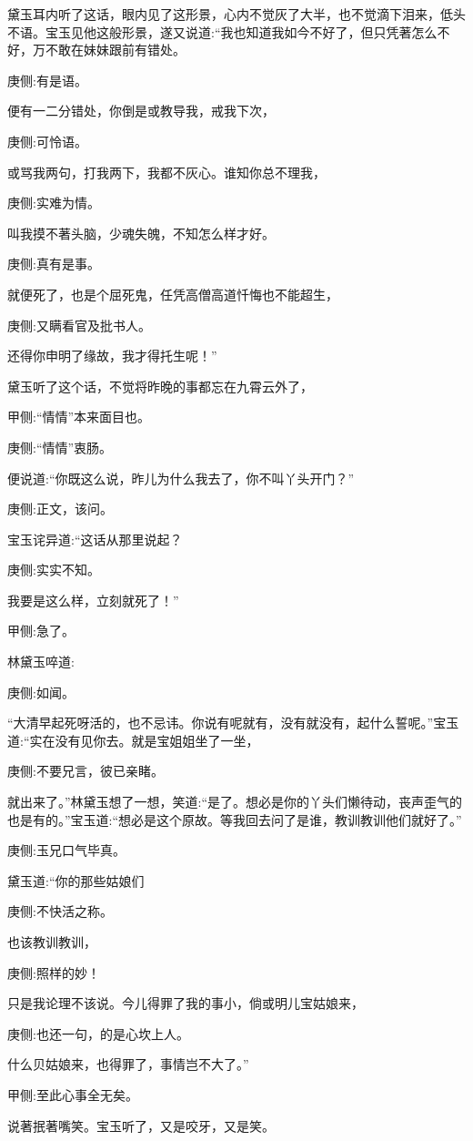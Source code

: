 \begin{parag}
    黛玉耳内听了这话，眼内见了这形景，心内不觉灰了大半，也不觉滴下泪来，低头不语。宝玉见他这般形景，遂又说道:“我也知道我如今不好了，但只凭著怎么不好，万不敢在妹妹跟前有错处。\begin{note}庚侧:有是语。\end{note}便有一二分错处，你倒是或教导我，戒我下次，\begin{note}庚侧:可怜语。\end{note}或骂我两句，打我两下，我都不灰心。谁知你总不理我，\begin{note}庚侧:实难为情。\end{note}叫我摸不著头脑，少魂失魄，不知怎么样才好。\begin{note}庚侧:真有是事。\end{note}就便死了，也是个屈死鬼，任凭高僧高道忏悔也不能超生，\begin{note}庚侧:又瞒看官及批书人。\end{note}还得你申明了缘故，我才得托生呢！”
\end{parag}


\begin{parag}
    黛玉听了这个话，不觉将昨晚的事都忘在九霄云外了，\begin{note}甲侧:“情情”本来面目也。\end{note}\begin{note}庚侧:“情情”衷肠。\end{note}便说道:“你既这么说，昨儿为什么我去了，你不叫丫头开门？”\begin{note}庚侧:正文，该问。\end{note}宝玉诧异道:“这话从那里说起？\begin{note}庚侧:实实不知。\end{note}我要是这么样，立刻就死了！”\begin{note}甲侧:急了。\end{note}林黛玉啐道:\begin{note}庚侧:如闻。\end{note}“大清早起死呀活的，也不忌讳。你说有呢就有，没有就没有，起什么誓呢。”宝玉道:“实在没有见你去。就是宝姐姐坐了一坐，\begin{note}庚侧:不要兄言，彼已亲睹。\end{note}就出来了。”林黛玉想了一想，笑道:“是了。想必是你的丫头们懒待动，丧声歪气的也是有的。”宝玉道:“想必是这个原故。等我回去问了是谁，教训教训他们就好了。”\begin{note}庚侧:玉兄口气毕真。\end{note}黛玉道:“你的那些姑娘们\begin{note}庚侧:不快活之称。\end{note}也该教训教训，\begin{note}庚侧:照样的妙！\end{note}只是我论理不该说。今儿得罪了我的事小，倘或明儿宝姑娘来，\begin{note}庚侧:也还一句，的是心坎上人。\end{note}什么贝姑娘来，也得罪了，事情岂不大了。”\begin{note}甲侧:至此心事全无矣。\end{note}说著抿著嘴笑。宝玉听了，又是咬牙，又是笑。
\end{parag}


